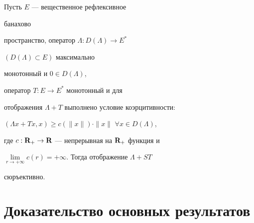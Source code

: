  


\begin{thm}[{\myfont{}[2]}] Пусть $E$ --- вещественное рефлексивное 


банахово 


пространство, оператор $\Lambda:D(\Lambda)\to E^*$ 


$(D(\Lambda)\subset E)$ максимально 


монотонный и $0\in D(\Lambda)$, 


оператор $T:E\to E^*$ монотонный и для 


отображения $\Lambda+T$ выполнено условие коэрцитивности$:$ 


$(\Lambda x+Tx,x)\ge c(\|x\|)\cdot\|x\|$\; $\forall x\in D(\Lambda)$, 


где $c:\bold R_+\to\bold R$ --- непрерывная на $\bold R_+$ функция и 


$\lim\limits_{r\to+\infty}c(r)=+\infty$. Тогда отображение $\Lambda+ST$ 


сюръективно. 


\end{thm} 


 


\section{Доказательство основных результатов} 


 


